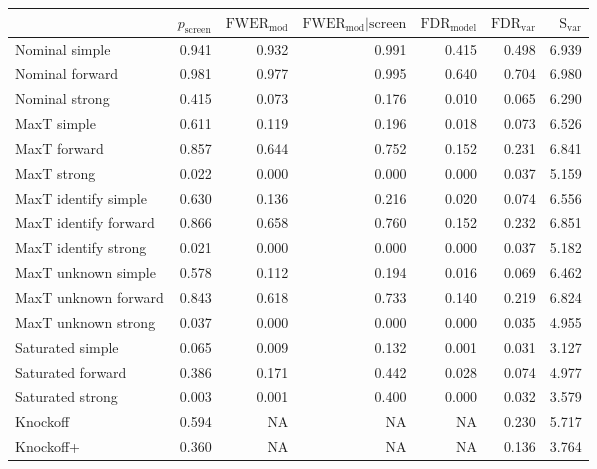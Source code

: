 
\newcommand{\guarantee}[1]{{\color{blue} #1}}
\begin{tabular}{|l|rrrrrr|}
 \hline
{} &  $p_{\text{screen}}$ &  $\text{FWER}_{\text{mod}}$ &  $\text{FWER}_{\text{mod}} \vert \text{screen}$ &  $\text{FDR}_{\text{model}}$ &  $\text{FDR}_{\text{var}}$ &  $\text{S}_{\text{var}}$ \\ \hline
Nominal simple & 0.941 & 0.932 & 0.991 & 0.415 & 0.498 & 6.939 \\ 
Nominal forward & 0.981 & 0.977 & 0.995 & 0.640 & 0.704 & 6.980 \\ 
Nominal strong & 0.415 & 0.073 & 0.176 & 0.010 & 0.065 & 6.290 \\ 
MaxT simple & 0.611 & \guarantee{0.119} & \guarantee{0.196} & \guarantee{0.018} & 0.073 & 6.526 \\ 
MaxT forward & 0.857 & 0.644 & 0.752 & \guarantee{0.152} & 0.231 & 6.841 \\ 
MaxT strong & 0.022 & \guarantee{0.000} & 0.000 & \guarantee{0.000} & 0.037 & 5.159 \\ 
MaxT identify simple & 0.630 & \guarantee{0.136} & \guarantee{0.216} & \guarantee{0.020} & 0.074 & 6.556 \\ 
MaxT identify forward & 0.866 & 0.658 & 0.760 & \guarantee{0.152} & 0.232 & 6.851 \\ 
MaxT identify strong & 0.021 & \guarantee{0.000} & 0.000 & \guarantee{0.000} & 0.037 & 5.182 \\ 
MaxT unknown simple & 0.578 & \guarantee{0.112} & \guarantee{0.194} & \guarantee{0.016} & 0.069 & 6.462 \\ 
MaxT unknown forward & 0.843 & 0.618 & 0.733 & \guarantee{0.140} & 0.219 & 6.824 \\ 
MaxT unknown strong & 0.037 & \guarantee{0.000} & 0.000 & \guarantee{0.000} & 0.035 & 4.955 \\ 
Saturated simple & 0.065 & 0.009 & 0.132 & 0.001 & 0.031 & 3.127 \\ 
Saturated forward & 0.386 & 0.171 & 0.442 & 0.028 & 0.074 & 4.977 \\ 
Saturated strong & 0.003 & 0.001 & 0.400 & 0.000 & 0.032 & 3.579 \\ 
Knockoff & 0.594 & NA & NA & NA & 0.230 & 5.717 \\ 
Knockoff+ & 0.360 & NA & NA & NA & \guarantee{0.136} & 3.764 \\   \hline
\end{tabular}